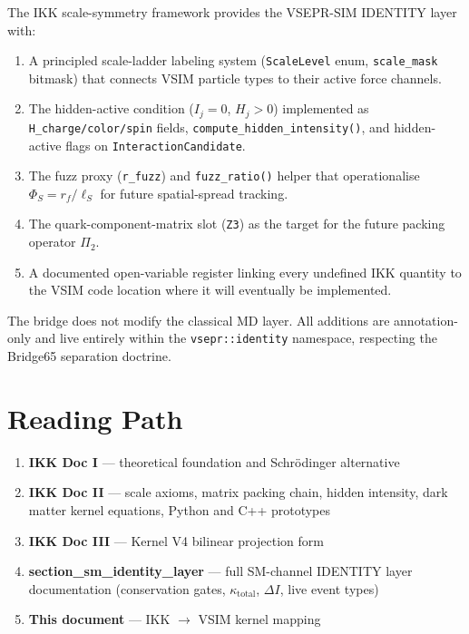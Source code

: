 \documentclass[11pt, a4paper, oneside]{article}
\newcommand{\Pack}{\Pi}
\theoremstyle{definition}
\theoremstyle{remark}
\begin{document}
The IKK scale-symmetry framework provides the VSEPR-SIM IDENTITY layer with:

\begin{enumerate}
  \item A principled scale-ladder labeling system (\texttt{ScaleLevel} enum,
	\texttt{scale\_mask} bitmask) that connects VSIM particle types to their
	active force channels.
  \item The hidden-active condition ($I_j=0$, $H_j>0$) implemented as
	\texttt{H\_charge/color/spin} fields, \texttt{compute\_hidden\_intensity()},
	and hidden-active flags on \texttt{InteractionCandidate}.
  \item The fuzz proxy (\texttt{r\_fuzz}) and \texttt{fuzz\_ratio()} helper
	that operationalise $\Phi_S = r_f / \ell_S$ for future spatial-spread tracking.
  \item The quark-component-matrix slot (\texttt{Z3}) as the target for the
	future packing operator $\Pack_2$.
  \item A documented open-variable register linking every undefined IKK quantity
	to the VSIM code location where it will eventually be implemented.
\end{enumerate}

The bridge does not modify the classical MD layer.  All additions are
annotation-only and live entirely within the \texttt{vsepr::identity}
namespace, respecting the Bridge65 separation doctrine.

\section*{Reading Path}

\begin{enumerate}
  \item \textbf{IKK Doc I} --- theoretical foundation and Schr\"{o}dinger alternative
  \item \textbf{IKK Doc II} --- scale axioms, matrix packing chain, hidden intensity,
		dark matter kernel equations, Python and C++ prototypes
  \item \textbf{IKK Doc III} --- Kernel V4 bilinear projection form
  \item \textbf{section\_sm\_identity\_layer} --- full SM-channel IDENTITY layer
		documentation (conservation gates, $\kappa_\text{total}$, $\Delta I$,
		live event types)
  \item \textbf{This document} --- IKK $\to$ VSIM kernel mapping
\end{enumerate}
\end{document}
